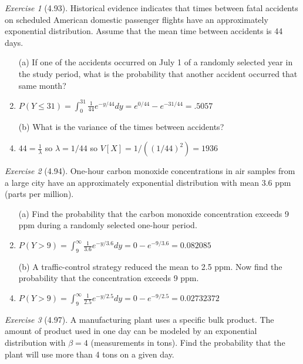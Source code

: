 \documentclass[12pt]{amsart}
\makeatletter
\theoremstyle{remark}
\newtheorem*{exercise}{Exercise}%
\renewenvironment{proof}[1][\proofname]{\par\doublespacing
  \pushQED{\qed}%
  \normalfont \topsep6\p@\@plus6\p@\relax
  \list{}{%
    \settowidth{\leftmargin}{\itshape\proofname:\hskip\labelsep}%
    \setlength{\labelwidth}{0pt}%
    \setlength{\itemindent}{-\leftmargin}%
  }%
  \item[\hskip\labelsep\itshape#1\@addpunct{:}]\ignorespaces
}{%
  \popQED\endlist\@endpefalse
  \singlespacing
}
\theoremstyle{mycomment}
\makeatother
\begin{document}
\begin{exercise}[4.93]
Historical evidence indicates that times between fatal accidents on scheduled American domestic passenger flights have an approximately exponential distribution. Assume that the mean time between accidents is 44 days.

\begin{enumerate}
    \item[(a)] If one of the accidents occurred on July 1 of a randomly selected year in the study period, what is the probability that another accident occurred that same month?
\begin{proof}[Solution]
  $P(Y \leq 31) = \int_0^{31} \frac{1}{44} e^{-y/44} dy = e^{0/44} - e^{-31/44} = .5057$
\end{proof}
    \item[(b)] What is the variance of the times between accidents?
\begin{proof}[Solution]
  $44 = \frac{1}{\lambda}$ so $\lambda = 1/44$ so $V[X] = 1/((1/44)^2) = 1936$
\end{proof}
\end{enumerate}
\end{exercise}

\begin{exercise}[4.94]
One-hour carbon monoxide concentrations in air samples from a large city have an approximately exponential distribution with mean 3.6 ppm (parts per million).

\begin{enumerate}
    \item[(a)] Find the probability that the carbon monoxide concentration exceeds 9 ppm during a randomly selected one-hour period.
\begin{proof}[Solution]
  $P(Y > 9) = \int_9^\infty \frac{1}{3.6} e^{-y/3.6} dy = 0 - e^{-9/3.6} = 0.082085$ 
\end{proof}
    \item[(b)] A traffic-control strategy reduced the mean to 2.5 ppm. Now find the probability that the concentration exceeds 9 ppm.
\begin{proof}[Solution]
  $P(Y > 9) = \int_9^\infty \frac{1}{2.5} e^{-y/2.5} dy = 0 - e^{-9/2.5} = 0.02732372$ 

\end{proof}
\end{enumerate}
\end{exercise}

\begin{exercise}[4.97]
A manufacturing plant uses a specific bulk product. The amount of product used in one day can be modeled by an exponential distribution with $\beta = 4$ (measurements in tons). Find the probability that the plant will use more than 4 tons on a given day.

\begin{proof}[Solution]
 
\end{proof}
\end{exercise}
\end{document}
